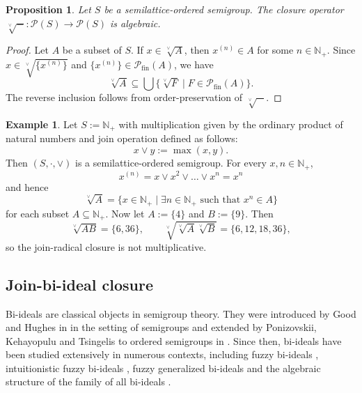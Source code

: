 \documentclass[10pt, reqno]{amsart}
\theoremstyle{plain}
\newtheorem{prop}[theorem]{Proposition}
\theoremstyle{definition}
\newtheorem{example}[theorem]{Example}
\begin{document}
\begin{prop}\label{join_radical_closure_is_algebraic}
    Let $S$ be a semilattice-ordered semigroup. The closure operator $\sqrt[\lor]{-} : \mathcal{P}(S) \rightarrow \mathcal{P}(S)$ is algebraic. 
\end{prop}
\begin{proof}
    Let $A$ be a subset of $S$. If $x \in \sqrt[\lor]{A}$, then $x^{(n)} \in A$ for some $n \in \mathbb{N}_+$. Since $x \in \sqrt[\lor]{\{x^{(n)}\}}$ and $\{x^{(n)}\} \in \mathcal{P}_\mathrm{fin}(A)$, we have 
    \begin{equation*}
        \sqrt[\lor]{A} \subseteq \bigcup \big\{\sqrt[\lor]{F} \mid F \in \mathcal{P}_\mathrm{fin}(A)\big\}.  
    \end{equation*}
    The reverse inclusion follows from order-preservation of $\sqrt[\lor]{-}$. 
\end{proof}
\begin{example}\label{join_radical_closure_is_not_multiplicative}
    Let $S := \mathbb{N}_+$ with multiplication given by the ordinary product of natural numbers and join operation defined as follows: $$x \lor y := \max(x,y).$$ Then $(S, \cdot, \lor)$ is a semilattice-ordered semigroup. For every $x, n\in\mathbb{N}_+$, $$x^{(n)} = x \lor x^2 \lor \ldots \lor x^n = x^n$$ and hence $$\sqrt[\lor]{A} = \{x \in \mathbb{N}_+ \mid \exists n \in\mathbb{N}_+ \text{ such that } x^n \in A\}$$ for each subset $A \subseteq \mathbb{N}_+$. Now let $A := \{4\}$ and $B := \{9\}$. Then $$\sqrt[\lor]{AB} = \{6, 36\}, \qquad \sqrt[\lor]{\sqrt[\lor]{A}\sqrt[\lor]{B}} = \{6, 12, 18, 36\},$$
    so the join-radical closure is not multiplicative. 
\end{example}

\subsection{Join-bi-ideal closure} 
Bi-ideals are classical objects in semigroup theory. They were introduced by Good and Hughes in \cite{good1952associated} in the setting of semigroups and extended by Ponizovskii, Kehayopulu and Tsingelis to ordered semigroups in \cite{Kehayopulu}. Since then, bi-ideals have been studied extensively in numerous contexts, including fuzzy bi-ideals \cite{KEHAYOPULU200513, Gaketem2023ONEB}, intuitionistic fuzzy bi-ideals \cite{Jun, Yongfa2007}, fuzzy generalized bi-ideals \cite{Khan} and the algebraic structure of the family of all bi-ideals \cite{Mallick}. 
\end{document}
